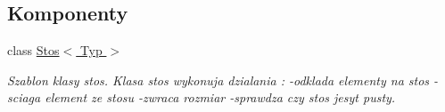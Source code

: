 \subsection*{Komponenty}
\begin{DoxyCompactItemize}
\item 
class \hyperlink{class_stos}{Stos$<$ Typ $>$}
\begin{DoxyCompactList}\small\item\em Szablon klasy stos. Klasa stos wykonuja dzialania \-: -\/odklada elementy na stos -\/sciaga element ze stosu -\/zwraca rozmiar -\/sprawdza czy stos jesyt pusty. \end{DoxyCompactList}\end{DoxyCompactItemize}
